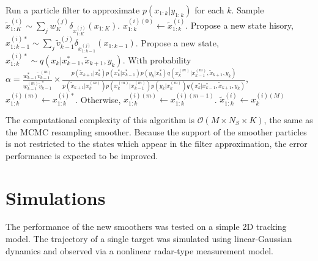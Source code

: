 \documentclass[journal]{IEEEtran}
\begin{document}
 \begin{algorithmic}
 	\STATE Run a particle filter to approximate $p(x_{1:k}|y_{1:k})$ for each $k$.
		\STATE Sample $\tilde{x}_{1:K}^{(i)} \sim \sum_j w_K^{(j)} \delta_{x_{1:K}^{(j)}}(x_{1:K})$.
			\STATE $x_{1:k}^{(i)(0)} \gets \tilde{x}_{1:k}^{(i)}$.
				\STATE Propose a new state hisory, $x_{1:k-1}^{(i)*} \sim \sum_j \tilde{v}_{k-1}^{(j)} \delta_{x_{1:k-1}^{(j)}}(x_{1:k-1})$.
				\STATE Propose a new state, $x_{1:k}^{(i)*} \sim q(x_k|x_{k-1}^{*},\tilde{x}_{k+1},y_k)$.
				\STATE With probability $\alpha = \frac{ w_{k-1}^{*} \tilde{v}_{k-1}^{(m)} }{  w_{k-1}^{(m)} \tilde{v}_{k-1}^{*} } \times \frac{ p(\tilde{x}_{k+1}|x_k^{*}) p(x_k^{*}|x_{k-1}^{*}) p(y_k|x_k^{*}) q(x_k^{(m)}|x_{k-1}^{(m)},\tilde{x}_{k+1},y_k) }{ p(\tilde{x}_{k+1}|x_k^{(m)}) p(x_k^{(m)}|x_{k-1}^{(m)}) p(y_k|x_k^{(m)}) q(x_k^{*}|x_{k-1}^{*},\tilde{x}_{k+1},y_k) }$, $x_{1:k}^{(i)(m)} \gets x_{1:k}^{(i)*}$. Otherwise, $x_{1:k}^{(i)(m)} \gets x_{1:k}^{(i)(m-1)}$.
			\ENDFOR
			\STATE $\tilde{x}_{1:k}^{(i)} \gets x_{k}^{(i)(M)}$
		\ENDFOR
	\ENDFOR
\end{algorithmic}

The computational complexity of this algorithm is $\mathcal{O}(M \times N_S \times K)$, the same as the MCMC resampling smoother. Because the support of the smoother particles is not restricted to the states which appear in the filter approximation, the error performance is expected to be improved.



\section{Simulations} \label{sec:simulations}

The performance of the new smoothers was tested on a simple 2D tracking model. The trajectory of a single target was simulated using linear-Gaussian dynamics and observed via a nonlinear radar-type measurement model.
\end{document}
